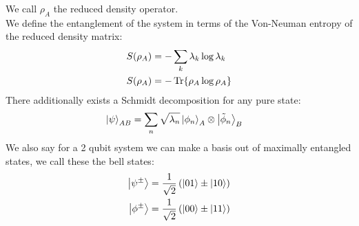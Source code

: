We call $\rho_A$ the reduced density operator.\\
We define the entanglement of the system in terms of the Von-Neuman entropy of the reduced density matrix:
\begin{align*}
	S(\rho_A) &= - \sum_k \lambda_k \log \lambda_k \\
	S(\rho_A) &= - \Tr{\rho_A\log\rho_A}
\end{align*}
There additionally exists a Schmidt decomposition for any pure state:
\begin{align*}
	\ket{\psi}_{AB} &= \sum_n \sqrt{\lambda_n} \ket{\phi_n}_A \otimes\ket{\tilde{\phi}_n}_B
\end{align*}
We also say for a 2 qubit system we can make a basis out of maximally entangled states, we call these the bell states:
\begin{align*}
	\ket{\psi^\pm} &= \frac{1}{\sqrt{2}}\left(\ket{01} \pm \ket{10}\right) \\
	\ket{\phi^\pm} &= \frac{1}{\sqrt{2}}\left(\ket{00} \pm \ket{11}\right)
\end{align*}
